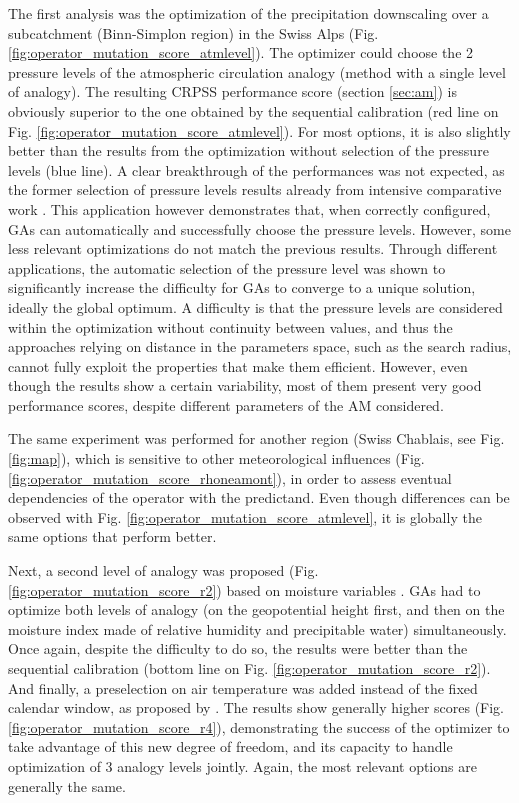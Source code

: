 \documentclass{ametsoc}
\begin{document}
The first analysis was the optimization of the precipitation downscaling over a subcatchment (Binn-Simplon region) in the Swiss Alps (Fig. \ref{fig:operator_mutation_score_atmlevel}). The optimizer could choose the 2 pressure levels of the atmospheric circulation analogy (method with a single level of analogy). The resulting CRPSS performance score (section \ref{sec:am}) is obviously superior to the one obtained by the sequential calibration (red line on Fig. \ref{fig:operator_mutation_score_atmlevel}). For most options, it is also slightly better than the results from the optimization without selection of the pressure levels (blue line). A clear breakthrough of the performances was not expected, as the former selection of pressure levels results already from intensive comparative work \citep{Bontron2004}. This application however demonstrates that, when correctly configured, GAs can automatically and successfully choose the pressure levels. However, some less relevant optimizations do not match the previous results. Through different applications, the automatic selection of the pressure level was shown to significantly increase the difficulty for GAs to converge to a unique solution, ideally the global optimum. A difficulty is that the pressure levels are considered within the optimization without continuity between values, and thus the approaches relying on distance in the parameters space, such as the search radius, cannot fully exploit the properties that make them efficient. However, even though the results show a certain variability, most of them present very good performance scores, despite different parameters of the AM considered.

The same experiment was performed for another region (Swiss Chablais, see Fig. \ref{fig:map}), which is sensitive to other meteorological influences (Fig. \ref{fig:operator_mutation_score_rhoneamont}), in order to assess eventual dependencies of the operator with the predictand. Even though differences can be observed with Fig. \ref{fig:operator_mutation_score_atmlevel}, it is globally the same options that perform better.

Next, a second level of analogy was proposed (Fig. \ref{fig:operator_mutation_score_r2}) based on moisture variables \citep[see][]{Bontron2004}. GAs had to optimize both levels of analogy (on the geopotential height first, and then on the moisture index made of relative humidity and precipitable water) simultaneously. Once again, despite the difficulty to do so, the results were better than the sequential calibration (bottom line on Fig. \ref{fig:operator_mutation_score_r2}). And finally, a preselection on air temperature was added instead of the fixed calendar window, as proposed by \cite{BenDaoud2016}. The results show generally higher scores (Fig. \ref{fig:operator_mutation_score_r4}), demonstrating the success of the optimizer to take advantage of this new degree of freedom, and its capacity to handle optimization of 3 analogy levels jointly. Again, the most relevant options are generally the same.
\end{document}
